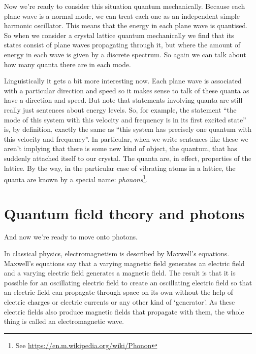 \documentclass[a4paper]{article}
\begin{document}
Now we're ready to consider this situation quantum mechanically.
Because each plane wave is a normal mode, we can treat each one as an independent simple harmonic oscillator.
This means that the energy in each plane wave is quantised.
So when we consider a crystal lattice quantum mechanically we find that its states consist of plane waves propagating through it, but where the amount of energy in each wave is given by a discrete spectrum.
So again we can talk about how many quanta there are in each mode.

Linguistically it gets a bit more interesting now.
Each plane wave is associated with a particular direction and speed so it makes sense to talk of these quanta as have a direction and speed.
But note that statements involving quanta are still really just sentences about energy levels.
So, for example, the statement ``the mode of this system with this velocity and frequency is in its first excited state'' is, by definition, exactly the same as ``this system has precisely one quantum with this velocity and frequency''.
In particular, when we write sentences like these we aren't implying that there is some new kind of object, the quantum, that has suddenly attached itself to our crystal.
The quanta are, in effect, properties of the lattice.
By the way, in the particular case of vibrating atoms in a lattice, the quanta are known by a special name: {\em phonons}\footnote{See \url{https://en.m.wikipedia.org/wiki/Phonon}}.

\section{Quantum field theory and photons}
And now we're ready to move onto photons.

In classical physics, electromagnetism is described by Maxwell's equations.
Maxwell's equations say that a varying magnetic field generates an electric field and a varying electric field generates a magnetic field.
The result is that it is possible for an oscillating electric field to create an oscillating electric field so that an electric field can propagate through space on its own without the help of electric charges or electric currents or any other kind of `generator'.
As these electric fields also produce magnetic fields that propagate with them, the whole thing is called an electromagnetic wave.
\end{document}
